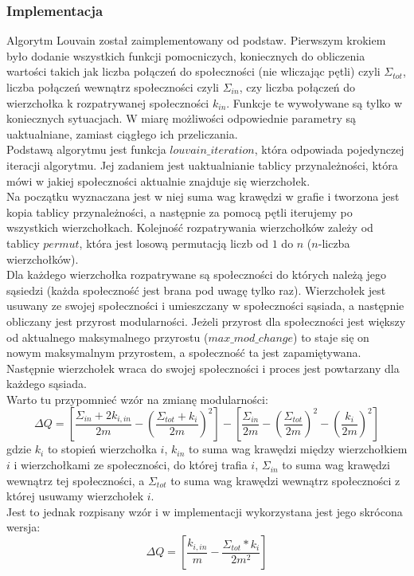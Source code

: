 \documentclass{article}
\begin{document}
\subsubsection{Implementacja}
Algorytm Louvain został zaimplementowany od podstaw. Pierwszym krokiem było dodanie wszystkich funkcji pomocniczych, koniecznych do obliczenia wartości takich jak liczba połączeń do społeczności (nie wliczając pętli) czyli $\Sigma_{tot}$, liczba połączeń wewnątrz społeczności czyli $\Sigma_{in}$, czy liczba połączeń do wierzchołka k rozpatrywanej społeczności $k_{in}$. Funkcje te wywoływane są tylko w koniecznych sytuacjach. W miarę możliwości odpowiednie parametry są uaktualniane, zamiast ciągłego ich przeliczania.\\

Podstawą algorytmu jest funkcja $louvain\_ iteration$, która odpowiada pojedynczej iteracji algorytmu. Jej zadaniem jest uaktualnianie tablicy przynależności, która mówi w jakiej społeczności aktualnie znajduje się wierzchołek.\\ 

Na początku wyznaczana jest w niej suma wag krawędzi w grafie i tworzona jest kopia tablicy przynależności, a następnie za pomocą pętli iterujemy po wszystkich wierzchołkach. Kolejność rozpatrywania wierzchołków zależy od tablicy $permut$, która jest losową permutacją liczb od $1$ do $n$ ($n$-liczba wierzchołków). \\

Dla każdego wierzchołka rozpatrywane są społeczności do których należą jego sąsiedzi (każda społeczność jest brana pod uwagę tylko raz). Wierzchołek jest usuwany ze swojej społeczności i umieszczany w społeczności sąsiada, a następnie obliczany jest przyrost modularności. Jeżeli przyrost dla społeczności jest większy od aktualnego maksymalnego przyrostu ($max\_ mod\_ change$) to staje się on nowym maksymalnym przyrostem, a społeczność ta jest zapamiętywana. Następnie wierzchołek wraca do swojej społeczności i proces jest powtarzany dla każdego sąsiada. \\

Warto tu przypomnieć wzór na zmianę modularności: $$\Delta Q = [\frac{\Sigma_{in} +2k_{i,in}}{2m} - (\frac{\Sigma_{tot} + k_i}{2m})^2] - [\frac{\Sigma_{in}}{2m} - (\frac{\Sigma_{tot}}{2m})^2 - (\frac{k_i}{2m})^2]$$ gdzie $k_i$ to stopień wierzchołka $i$, $k_{in}$ to suma wag krawędzi między wierzchołkiem $i$ i wierzchołkami ze społeczności, do której trafia $i$, $\Sigma_{in}$ to suma wag krawędzi wewnątrz tej społeczności, a $\Sigma_{tot}$ to suma wag krawędzi wewnątrz społeczności z której usuwamy wierzchołek $i$.\\Jest to jednak rozpisany wzór i w implementacji wykorzystana jest jego skrócona wersja: $$\Delta Q = [\frac{k_{i,in}}{m} - \frac{\Sigma_{tot}*k_i}{2m^2}]$$ \\
\end{document}
